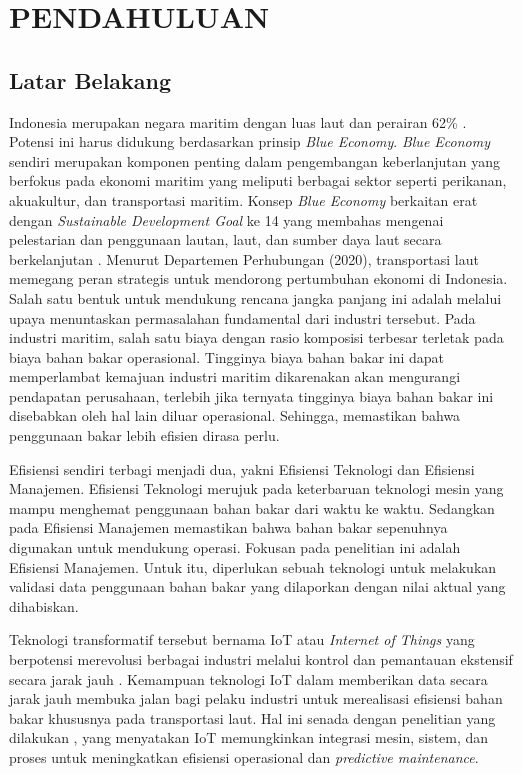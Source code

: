 \chapter{PENDAHULUAN}

\section{Latar Belakang}

\noindent Indonesia merupakan negara maritim dengan luas laut dan perairan 62\% \parencite{inproc:wuryadani}. Potensi ini harus didukung berdasarkan prinsip \textit{Blue Economy}. \textit{Blue Economy} sendiri merupakan komponen penting dalam pengembangan keberlanjutan yang berfokus pada ekonomi maritim yang meliputi berbagai sektor seperti perikanan, akuakultur, dan transportasi maritim. Konsep \textit{Blue Economy} berkaitan erat dengan \textit{Sustainable Development Goal} ke 14 yang membahas mengenai pelestarian dan penggunaan lautan, laut, dan sumber daya laut secara berkelanjutan \parencite{misc:lse}. Menurut Departemen Perhubungan (2020), transportasi laut memegang peran strategis untuk mendorong pertumbuhan ekonomi di Indonesia. Salah satu bentuk untuk mendukung rencana jangka panjang ini adalah melalui upaya menuntaskan permasalahan fundamental dari industri tersebut. Pada industri maritim, salah satu biaya dengan rasio komposisi terbesar terletak pada biaya bahan bakar operasional. Tingginya biaya bahan bakar ini dapat memperlambat kemajuan industri maritim dikarenakan akan mengurangi pendapatan perusahaan, terlebih jika ternyata tingginya biaya bahan bakar ini disebabkan oleh hal lain diluar operasional. Sehingga, memastikan bahwa penggunaan bakar lebih efisien dirasa perlu.

Efisiensi sendiri terbagi menjadi dua, yakni Efisiensi Teknologi dan Efisiensi Manajemen. Efisiensi Teknologi merujuk pada keterbaruan teknologi mesin yang mampu menghemat penggunaan bahan bakar dari waktu ke waktu. Sedangkan pada Efisiensi Manajemen memastikan bahwa bahan bakar sepenuhnya digunakan untuk mendukung operasi. Fokusan pada penelitian ini adalah Efisiensi Manajemen. Untuk itu, diperlukan sebuah teknologi untuk melakukan validasi data penggunaan bahan bakar yang dilaporkan dengan nilai aktual yang dihabiskan.

Teknologi transformatif tersebut bernama IoT atau \textit{Internet of Things} yang berpotensi merevolusi berbagai industri melalui kontrol dan pemantauan ekstensif secara jarak jauh \parencite{article:hercog}. Kemampuan teknologi IoT dalam memberikan data secara jarak jauh membuka jalan bagi pelaku industri untuk merealisasi efisiensi bahan bakar khususnya pada transportasi laut. Hal ini senada dengan penelitian yang dilakukan \textcite{article:suciu}, yang menyatakan IoT memungkinkan integrasi mesin, sistem, dan proses untuk meningkatkan efisiensi operasional dan \textit{predictive maintenance}.

